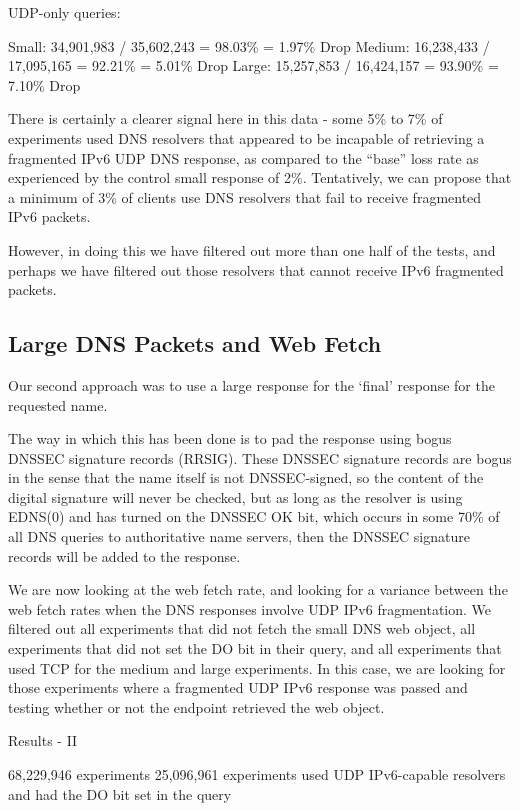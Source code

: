 UDP-only queries: 

Small:  34,901,983 / 35,602,243 = 98.03\% = 1.97\% Drop 
Medium: 16,238,433 / 17,095,165 = 92.21\% = 5.01\% Drop 
Large:  15,257,853 / 16,424,157 = 93.90\% = 7.10\% Drop 

There is certainly a clearer signal here in this data - some 5\% to 7\% of experiments used DNS resolvers that appeared to be incapable of retrieving a fragmented IPv6 UDP DNS response, as compared to the “base” loss rate as experienced by the control small response of 2\%. Tentatively, we can propose that a minimum of 3\% of clients use DNS resolvers that fail to receive fragmented IPv6 packets.

However, in doing this we have filtered out more than one half of the tests, and perhaps we have filtered out those resolvers that cannot receive IPv6 fragmented packets.

\subsection{Large DNS Packets and Web Fetch}

Our second approach was to use a large response for the ‘final’ response for the requested name.

The way in which this has been done is to pad the response using bogus DNSSEC signature records (RRSIG). These DNSSEC signature records are bogus in the sense that the name itself is not DNSSEC-signed, so the content of the digital signature will never be checked, but as long as the resolver is using EDNS(0) and has turned on the DNSSEC OK bit, which occurs in some 70\% of all DNS queries to authoritative name servers, then the DNSSEC signature records will be added to the response.

We are now looking at the web fetch rate, and looking for a variance between the web fetch rates when the DNS responses involve UDP IPv6 fragmentation. We filtered out all experiments that did not fetch the small DNS web object, all experiments that did not set the DO bit in their query, and all experiments that used TCP for the medium and large experiments. In this case, we are looking for those experiments where a fragmented UDP IPv6 response was passed and testing whether or not the endpoint retrieved the web object.

Results - II 

68,229,946 experiments 
25,096,961 experiments used UDP IPv6-capable resolvers
           and had the DO bit set in the query


